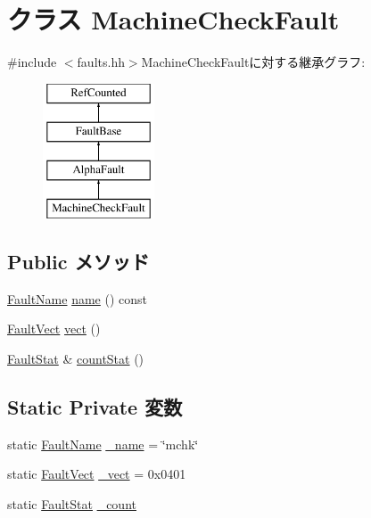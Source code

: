 \hypertarget{classAlphaISA_1_1MachineCheckFault}{
\section{クラス MachineCheckFault}
\label{classAlphaISA_1_1MachineCheckFault}
}


{\ttfamily \#include $<$faults.hh$>$}MachineCheckFaultに対する継承グラフ:\begin{figure}[H]
\begin{center}
\leavevmode
\includegraphics[height=4cm]{classAlphaISA_1_1MachineCheckFault}
\end{center}
\end{figure}
\subsection*{Public メソッド}
\begin{DoxyCompactItemize}
\item 
\hyperlink{sim_2faults_8hh_abb196df64725e5c2568c900cf130d8d7}{FaultName} \hyperlink{classAlphaISA_1_1MachineCheckFault_a73adb23259baf912a81683a9790a303f}{name} () const 
\item 
\hyperlink{classm5_1_1params_1_1Addr}{FaultVect} \hyperlink{classAlphaISA_1_1MachineCheckFault_ae15c5d7ab0162821b93d668d0b225198}{vect} ()
\item 
\hyperlink{classStats_1_1Scalar}{FaultStat} \& \hyperlink{classAlphaISA_1_1MachineCheckFault_a6c79663c761ff57265459f7e3aefaf4c}{countStat} ()
\end{DoxyCompactItemize}
\subsection*{Static Private 変数}
\begin{DoxyCompactItemize}
\item 
static \hyperlink{sim_2faults_8hh_abb196df64725e5c2568c900cf130d8d7}{FaultName} \hyperlink{classAlphaISA_1_1MachineCheckFault_ac79073ffcd2c66a09bcd3bd3ad206019}{\_\-name} = \char`\"{}mchk\char`\"{}
\item 
static \hyperlink{classm5_1_1params_1_1Addr}{FaultVect} \hyperlink{classAlphaISA_1_1MachineCheckFault_ad9e5855b9db0b2824cf6c507be4a872e}{\_\-vect} = 0x0401
\item 
static \hyperlink{classStats_1_1Scalar}{FaultStat} \hyperlink{classAlphaISA_1_1MachineCheckFault_a4bff925c412f331c5aaf6a39b79619ff}{\_\-count}
\end{DoxyCompactItemize}


